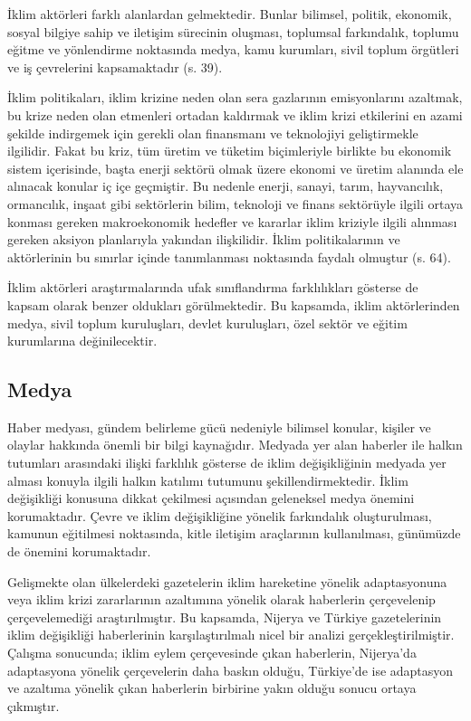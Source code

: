 \documentclass[
]{book}
\begin{document}
İklim aktörleri farklı alanlardan gelmektedir. Bunlar bilimsel, politik, ekonomik, sosyal bilgiye sahip ve iletişim sürecinin oluşması, toplumsal farkındalık, toplumu eğitme ve yönlendirme noktasında medya, kamu kurumları, sivil toplum örgütleri ve iş çevrelerini kapsamaktadır (s. 39). \citep{ozmen2011cevre}

İklim politikaları, iklim krizine neden olan sera gazlarının emisyonlarını azaltmak, bu krize neden olan etmenleri ortadan kaldırmak ve iklim krizi etkilerini en azami şekilde indirgemek için gerekli olan finansmanı ve teknolojiyi geliştirmekle ilgilidir. Fakat bu kriz, tüm üretim ve tüketim biçimleriyle birlikte bu ekonomik sistem içerisinde, başta enerji sektörü olmak üzere ekonomi ve üretim alanında ele alınacak konular iç içe geçmiştir. Bu nedenle enerji, sanayi, tarım, hayvancılık, ormancılık, inşaat gibi sektörlerin bilim, teknoloji ve finans sektörüyle ilgili ortaya konması gereken makroekonomik hedefler ve kararlar iklim kriziyle ilgili alınması gereken aksiyon planlarıyla yakından ilişkilidir. İklim politikalarının ve aktörlerinin bu sınırlar içinde tanımlanması noktasında faydalı olmuştur (s. 64). \citep{sahin2014turkiye}

İklim aktörleri araştırmalarında ufak sınıflandırma farklılıkları gösterse de kapsam olarak benzer oldukları görülmektedir. Bu kapsamda, iklim aktörlerinden medya, sivil toplum kuruluşları, devlet kuruluşları, özel sektör ve eğitim kurumlarına değinilecektir.

\hypertarget{medya}{%
\subsection{Medya}\label{medya}}

Haber medyası, gündem belirleme gücü nedeniyle bilimsel konular, kişiler ve olaylar hakkında önemli bir bilgi kaynağıdır. Medyada yer alan haberler ile halkın tutumları arasındaki ilişki farklılık gösterse de iklim değişikliğinin medyada yer alması konuyla ilgili halkın katılımı tutumunu şekillendirmektedir. \citep{gunay2021media} İklim değişikliği konusuna dikkat çekilmesi açısından geleneksel medya önemini korumaktadır. Çevre ve iklim değişikliğine yönelik farkındalık oluşturulması, kamunun eğitilmesi noktasında, kitle iletişim araçlarının kullanılması, günümüzde de önemini korumaktadır.

Gelişmekte olan ülkelerdeki gazetelerin iklim hareketine yönelik adaptasyonuna veya iklim krizi zararlarının azaltımına yönelik olarak haberlerin çerçevelenip çerçevelemediği araştırılmıştır. Bu kapsamda, Nijerya ve Türkiye gazetelerinin iklim değişikliği haberlerinin karşılaştırılmalı nicel bir analizi gerçekleştirilmiştir. Çalışma sonucunda; iklim eylem çerçevesinde çıkan haberlerin, Nijerya'da adaptasyona yönelik çerçevelerin daha baskın olduğu, Türkiye'de ise adaptasyon ve azaltıma yönelik çıkan haberlerin birbirine yakın olduğu sonucu ortaya çıkmıştır. \citep{gunay2021media}
\end{document}
